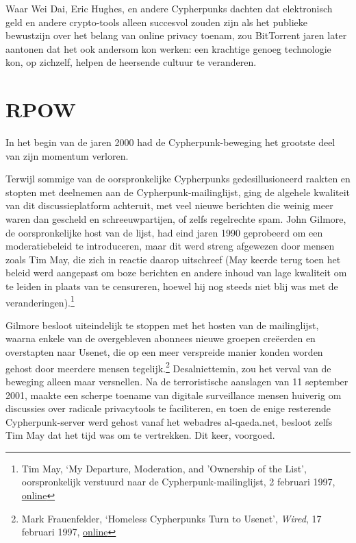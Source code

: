 \documentclass[smalldemyvopaper,11pt,twoside,onecolumn,openright,extrafontsizes,hidelinks]{memoir}
\begin{document}
Waar Wei Dai, Eric Hughes, en andere Cypherpunks dachten dat
elektronisch geld en andere crypto-tools alleen succesvol zouden zijn
als het publieke bewustzijn over het belang van online privacy toenam,
zou BitTorrent jaren later aantonen dat het ook andersom kon werken: een
krachtige genoeg technologie kon, op zichzelf, helpen de heersende
cultuur te veranderen.

\chapter{RPOW}\label{rpow}

In het begin van de jaren 2000 had de Cypherpunk-beweging het grootste
deel van zijn momentum verloren.

Terwijl sommige van de oorspronkelijke Cypherpunks gedesillusioneerd
raakten en stopten met deelnemen aan de Cypherpunk-mailinglijst, ging de
algehele kwaliteit van dit discussieplatform achteruit, met veel nieuwe
berichten die weinig meer waren dan gescheld en schreeuwpartijen, of
zelfs regelrechte spam. John Gilmore, de oorspronkelijke host van de
lijst, had eind jaren 1990 geprobeerd om een moderatiebeleid te
introduceren, maar dit werd streng afgewezen door mensen zoals Tim May,
die zich in reactie daarop uitschreef (May keerde terug toen het beleid
werd aangepast om boze berichten en andere inhoud van lage kwaliteit om
te leiden in plaats van te censureren, hoewel hij nog steeds niet blij
was met de veranderingen).\footnote{Tim May, `My Departure, Moderation,
  and 'Ownership of the List', oorspronkelijk verstuurd naar de
  Cypherpunk-mailinglijst, 2 februari 1997,
  \href{https://cypherpunks.venona.com/date/1997/02/msg02898.html}{online}}

Gilmore besloot uiteindelijk te stoppen met het hosten van de
mailinglijst, waarna enkele van de overgebleven abonnees nieuwe groepen
creëerden en overstapten naar Usenet, die op een meer verspreide manier
konden worden gehost door meerdere mensen tegelijk.\footnote{\hspace{0pt}Mark
  Frauenfelder, `Homeless Cypherpunks Turn to Usenet', \emph{Wired}, 17
  februari 1997,
  \href{https://www.wired.com/1997/02/homeless-cypherpunks-turn-to-usenet/}{online}}
Desalniettemin, zou het verval van de beweging alleen maar versnellen.
Na de terroristische aanslagen van 11 september 2001, maakte een scherpe
toename van digitale surveillance mensen huiverig om discussies over
radicale privacytools te faciliteren, en toen de enige resterende
Cypherpunk-server werd gehost vanaf het webadres al-qaeda.net, besloot
zelfs Tim May dat het tijd was om te vertrekken. Dit keer, voorgoed.
\end{document}

